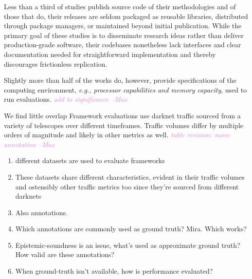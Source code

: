 \documentclass[manuscript,nonacm]{acmart}
\newcommand{\maxnote}[1]{\textit{\textcolor{violet}{#1 --Max}}}
\begin{document}

Less than a third of studies publish source code of their methodologies and of those that do, their releases are seldom packaged as reusable libraries, distributed through package managers, or maintained beyond initial publication. 
While the primary goal of these studies is to disseminate research ideas rather than deliver production-grade software, their codebases nonetheless lack interfaces and clear documentation needed for straightforward implementation and thereby discourages frictionless replication.

Slightly more than half of the works do, however, provide specifications of the computing environment, \textit{e.g., processor capabilities and memory capacity}, used to run evaluations.
\maxnote{add to significance}

We find little overlap 
Framework evaluations use darknet traffic sourced from a variety of telescopes over different timeframes.
Traffic volumes differ by multiple orders of magnitude and likely in other metrics as well.
\maxnote{table revision: move annotation}

\begin{enumerate}
	\item different datasets are used to evaluate frameworks
	\item These datasets share different characteristics, evident in their traffic volumes and ostensibly other traffic metrics too since they're sourced from different darknets
	\item Also annotations. 
	\item Which annotations are commonly used as ground truth? Mira. Which works?
	\item Epistemic-soundness is an issue, what's used as approximate ground truth? How valid are these annotations?
	\item When ground-truth isn't available, how is performance evaluated?
\end{enumerate}
\end{document}
